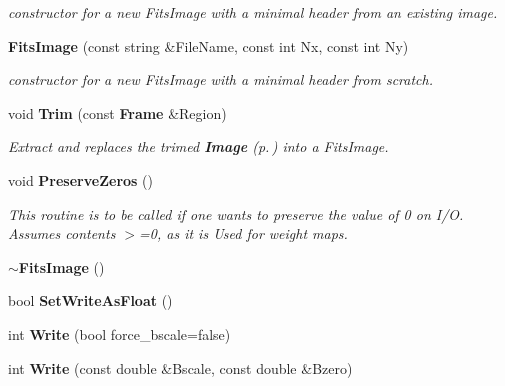 \begin{CompactItemize}
\begin{CompactList}\small\item\em constructor for a new Fits\-Image with a minimal header from an existing image.\item\end{CompactList}\item 
{}
{\bf Fits\-Image} (const string \&File\-Name, const int Nx, const int Ny)\label{class_fitsimage_a5}

\begin{CompactList}\small\item\em constructor for a new Fits\-Image with a minimal header from scratch.\item\end{CompactList}\item 
{}
void {\bf Trim} (const {\bf Frame} \&Region)\label{class_fitsimage_a6}

\begin{CompactList}\small\item\em Extract and replaces the trimed {\bf Image} {\rm (p.\,\pageref{class_image})} into a Fits\-Image.\item\end{CompactList}\item 
{}
void {\bf Preserve\-Zeros} ()\label{class_fitsimage_a7}

\begin{CompactList}\small\item\em This routine is to be called if one wants to preserve the value of 0 on I/O. Assumes contents $>$=0, as it is Used for weight maps.\item\end{CompactList}\item 
{}
{\bf $\sim$Fits\-Image} ()\label{class_fitsimage_a8}

\item 
{}
bool {\bf Set\-Write\-As\-Float} ()\label{class_fitsimage_a9}

\item 
{}
int {\bf Write} (bool force\_\-bscale=false)\label{class_fitsimage_a10}

\item 
{}
int {\bf Write} (const double \&Bscale, const double \&Bzero)\label{class_fitsimage_a11}

\end{CompactItemize}


